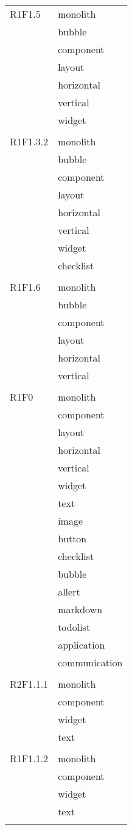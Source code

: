 \begin{center}
\begin{longtable}{|p{7cm}|p{7cm}|}
		R1F1.5 & monolith \\ & bubble \\ & component \\ & layout \\ & horizontal \\ & vertical \\ & widget \\ & \\ \hline
		R1F1.3.2 & monolith \\ & bubble \\ & component \\ & layout \\ & horizontal \\ & vertical \\ & widget \\ & checklist \\ & \\ \hline
		R1F1.6 & monolith \\ & bubble \\ & component \\ & layout \\ & horizontal \\ & vertical \\ & \\ \hline
		R1F0 & monolith \\ & component \\ & layout \\ & horizontal \\ & vertical \\ & widget \\ & text \\ & image \\ & button \\ & checklist \\ & bubble \\ & allert \\ & markdown \\ & todolist \\ & application \\ & communication \\ & \\ \hline
		R2F1.1.1 & monolith \\ & component \\ & widget \\ & text \\ & \\ \hline
		R1F1.1.2 & monolith \\ & component \\ & widget \\ & text \\ & \\ \hline

\end{longtable}
\end{center}
